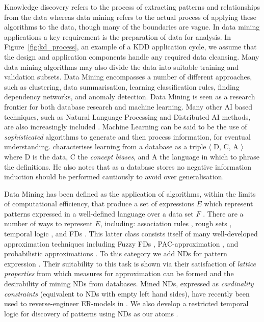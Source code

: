 \medskip

Knowledge
discovery refers to the process of extracting patterns and relationships 
from the data whereas data mining refers to the actual process of applying
these algorithms to the data, though many of the boundaries are vague.
In data mining applications a key requirement is 
the preparation of data for analysis. In Figure~\ref{fig:kd_process},
an example of a KDD application cycle, we assume that the
design and application components handle any required data
cleansing. Many data mining algorithms may also divide the data into
suitable training and validation subsets.   
Data Mining encompasses a number of different
approaches, such as clustering, data summarisation, learning
classification rules, finding dependency networks, 
and anomaly detection.  Data Mining is seen as a research frontier
for both database research and machine learning. Many other AI based techniques, such as Natural Language 
Processing and Distributed AI methods, are also increasingly included
\cite{kdd96}.  Machine Learning can be said to be the use of {\em
sophisticated} algorithms to generate and then process information,
for eventual understanding. \cite{xiao95} characterises learning from a
database as a triple $\langle$ D, C, A $\rangle$ where 
D is the data, C the {\em concept biases}, and A the language in which to
phrase the definitions. He also notes that as a database stores no  
negative information induction should be performed cautiously to avoid
over generalisation.
\medskip

Data Mining has been defined as the application of algorithms, within
the limits of computational efficiency, that produce a set of
expressions $E$ which represent patterns expressed in a well-defined
language over a data set $F$ \cite{kdd96}. There are a number of ways to
represent $E$, including: association rules \cite{ais93,toi96b}, rough
sets \cite{ziar91,incunc93}, temporal logic \cite{pt96,bt98}, and
FDs \cite{km95}. This 
latter class consists itself of many well-developed approximation
techniques including Fuzzy FDs \cite{bdp94}, PAC-approximation
\cite{at94,km95}, and probabilistic approximations
\cite{psm93,pk95,hkp98}. To this category we add NDs for pattern
expression \cite{cl98}. Their suitability to this task is shown via
their satisfaction of {\em lattice properties} from which measures for
approximation can be formed and the desirability of
mining NDs from databases. Mined NDs, expressed as {\em cardinality
constraints} (equivalent to NDs with empty left hand sides), have
recently been used to
reverse-engineer ER-models in \cite{sou98}. We also develop a
restricted temporal logic for discovery of patterns using NDs as our
atoms \cite{cl98f}.

